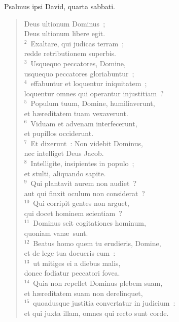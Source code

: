 \bchapter
\lettrine[lines=3,image=true,loversize=0.05,lraise=-0.03]{P}{}salmus ipsi David, quarta sabbati. \begin{flushleft}\begin{verse}\vspace{6pt}Deus ultionum Dominus~;\\ Deus ultionum libere egit.\\
${}^{2}$~Exaltare, qui judicas terram~;\\ redde retributionem superbis.\\
${}^{3}$~Usquequo peccatores, Domine,\\ usquequo peccatores gloriabuntur~;\\
${}^{4}$~effabuntur et loquentur iniquitatem~;\\ loquentur omnes qui operantur injustitiam~?\\
${}^{5}$~Populum tuum, Domine, humiliaverunt,\\ et h\ae reditatem tuam vexaverunt.\\
${}^{6}$~Viduam et advenam interfecerunt,\\ et pupillos occiderunt.\\
${}^{7}$~Et dixerunt~: Non videbit Dominus,\\ nec intelliget Deus Jacob.\\
${}^{8}$~Intelligite, insipientes in populo~;\\ et stulti, aliquando sapite.\\
${}^{9}$~Qui plantavit aurem non audiet~?\\ aut qui finxit oculum non considerat~?\\
${}^{10}$~Qui corripit gentes non arguet,\\ qui docet hominem scientiam~?\\
${}^{11}$~Dominus scit cogitationes hominum,\\ quoniam van\ae\ sunt.\\
${}^{12}$~Beatus homo quem tu erudieris, Domine,\\ et de lege tua docueris eum~:\\
${}^{13}$~ut mitiges ei a diebus malis,\\ donec fodiatur peccatori fovea.\\
${}^{14}$~Quia non repellet Dominus plebem suam,\\ et h\ae reditatem suam non derelinquet,\\
${}^{15}$~quoadusque justitia convertatur in judicium~:\\ et qui juxta illam, omnes qui recto sunt corde.\\

\end{verse}
\end{flushleft}
